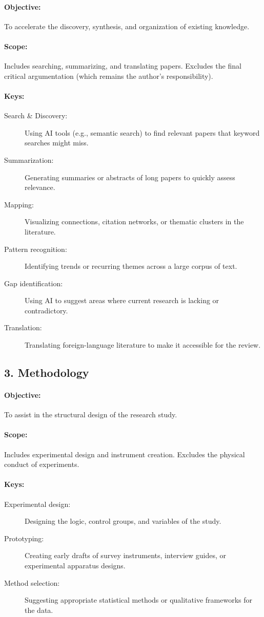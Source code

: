\documentclass[11pt]{article}
\begin{document}
\paragraph{Objective:} To accelerate the discovery, synthesis, and organization of existing knowledge.
\paragraph{Scope:} Includes searching, summarizing, and translating papers.
Excludes the final critical argumentation (which remains the author's responsibility).
\paragraph{Keys:}
\begin{description}
    \item[Search \& Discovery:] Using AI tools (e.g., semantic search) to find relevant papers that keyword searches might miss.
    \item[Summarization:] Generating summaries or abstracts of long papers to quickly assess relevance.
    \item[Mapping:] Visualizing connections, citation networks, or thematic clusters in the literature.
    \item[Pattern recognition:] Identifying trends or recurring themes across a large corpus of text.
    \item[Gap identification:] Using AI to suggest areas where current research is lacking or contradictory.
    \item[Translation:] Translating foreign-language literature to make it accessible for the review.
\end{description}

\subsection*{3. Methodology}
\paragraph{Objective:} To assist in the structural design of the research study.
\paragraph{Scope:} Includes experimental design and instrument creation.
Excludes the physical conduct of experiments.
\paragraph{Keys:}
\begin{description}
    \item[Experimental design:] Designing the logic, control groups, and variables of the study.
    \item[Prototyping:] Creating early drafts of survey instruments, interview guides, or experimental apparatus designs.
    \item[Method selection:] Suggesting appropriate statistical methods or qualitative frameworks for the data.
\end{description}
\end{document}
